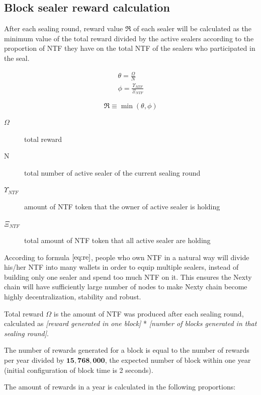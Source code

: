 \documentclass[12pt,oneside]{amsart}
\begin{document}
\begin{multicols}{2}
\section{Block sealer reward calculation}

After each sealing round, reward value $\Re$ of each sealer will be calculated as the minimum value of the total reward divided by the active sealers according to the proportion of {\small NTF} they have on the total {\small NTF} of the sealers who participated in the seal.
  
\begin{eqnarray}
\theta = \frac{\Omega}{N} \\
\phi = \frac{\Upsilon_{NTF}}{\Xi_{NTF}}
\end{eqnarray}

\begin{equation}\label{eq:re}
\Re \equiv \min(\theta, \phi)
\end{equation}

\begin{description}
\item[$\Omega$] total reward
\item[N] total number of active sealer of the current sealing round
\item[$\Upsilon_{NTF}$] amount of NTF token that the owner of active sealer is holding
\item[$\Xi_{NTF}$] total amount of NTF token that all active sealer are holding
\end{description}

According to formula $\eqref{eq:re}$, people who own {\small NTF} in a natural way will divide his/her {\small NTF} into many wallets in order to equip multiple sealers, instead of building only one sealer and spend too much  {\small NTF} on it. This ensures the Nexty chain will have sufficiently large number of nodes to make Nexty chain become highly decentralization, stability and robust.

Total reward $\Omega$ is the amount of {\small NTF} was produced after each sealing round, calculated as \textit{[reward generated in one block]} * \textit{[number of blocks generated in that sealing round]}.

The number of rewards generated for a block is equal to the number of rewards per year divided by $\mathbf{15,768,000}$, the expected number of block within one year (initial configuration of block time is 2 seconds).
 
The amount of rewards in a year is calculated in the following proportions:


\end{multicols}
\end{document}
